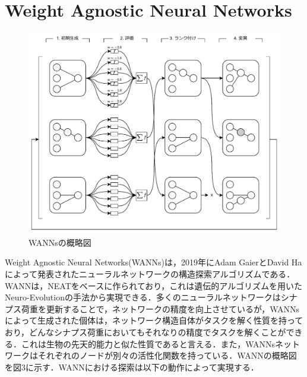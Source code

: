 \section{Weight Agnostic Neural Networks}

\begin{figure}[h]
    \begin{center}
        \includegraphics[scale=0.8]{img/expwann.pdf}
        \caption{WANNsの概略図}
    \end{center}
\end{figure}

Weight Agnostic Neural Networks(WANNs)は，2019年にAdam GaierとDavid Haによって発表されたニューラルネットワークの構造探索アルゴリズムである\cite{WANN}．WANNは，NEAT\cite{NEAT}をベースに作られており，これは遺伝的アルゴリズム\cite{遺伝的アルゴリズム}を用いたNeuro-Evolution\cite{NE}の手法から実現できる．多くのニューラルネットワークはシナプス荷重を更新することで，ネットワークの精度を向上させているが，WANNsによって生成された個体は，ネットワーク構造自体がタスクを解く性質を持っており，どんなシナプス荷重においてもそれなりの精度でタスクを解くことができる．これは生物の先天的能力と似た性質であると言える\cite{先天的能力}．また，WANNsネットワークはそれぞれのノードが別々の活性化関数を持っている．WANNの概略図を図3に示す．WANNにおける探索は以下の動作によって実現する．

